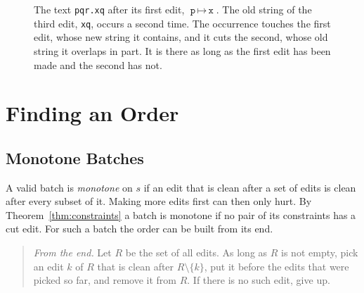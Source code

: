 \documentclass[acmsmall,nonacm,screen]{acmart}
\newcommand{\edit}[2]{\texttt{#1}\,{\mapsto}\,\texttt{#2}}
\newcommand{\str}[1]{\texttt{#1}}
\begin{document}
\begin{figure}
\centering
{}
\caption{The text \str{pqr.xq} after its first edit, $\edit{p}{x}$. The old string of the third
edit, \str{xq}, occurs a second time. The occurrence touches the first edit, whose new string
it contains, and it cuts the second, whose old string it overlaps in part. It is there as long
as the first edit has been made and the second has not.}\label{fig:anatomy}
\end{figure}

\section{Finding an Order}\label{sec:orders}

\subsection{Monotone Batches}

A valid batch is \emph{monotone} on $s$ if an edit that is clean after a set of edits is
clean after every subset of it. Making more edits first can then only hurt. By
Theorem~\ref{thm:constraints} a batch is monotone if no pair of its constraints has a cut
edit. For such a batch the order can be built from its end.

\begin{quote}
\emph{From the end.} Let $R$ be the set of all edits. As long as $R$ is not empty, pick an
edit $k$ of $R$ that is clean after $R \setminus \{k\}$, put it before the edits that were
picked so far, and remove it from $R$. If there is no such edit, give up.
\end{quote}
\end{document}

